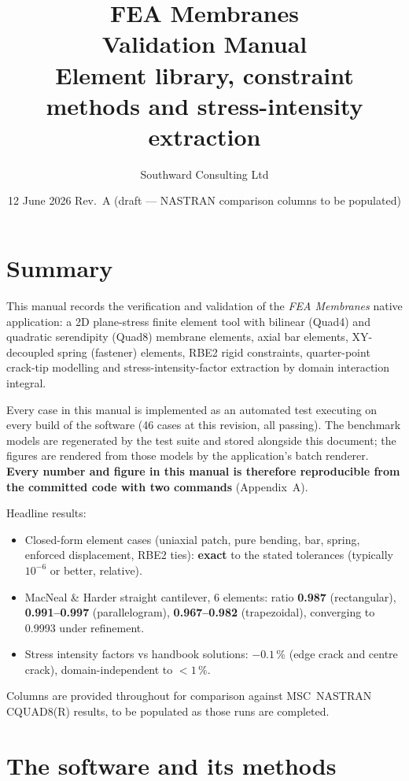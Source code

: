 \documentclass[11pt,a4paper]{report}
\title{\textbf{FEA Membranes}\\[2mm]\LARGE Validation Manual\\[4mm]
\large Element library, constraint methods and stress-intensity extraction}
\author{Southward Consulting Ltd}
\date{12 June 2026 \quad Rev.\ A (draft --- NASTRAN comparison columns to be populated)}
\begin{document}
\maketitle

\chapter*{Summary}

This manual records the verification and validation of the \emph{FEA Membranes}
native application: a 2D plane-stress finite element tool with bilinear (Quad4)
and quadratic serendipity (Quad8) membrane elements, axial bar elements,
XY-decoupled spring (fastener) elements, RBE2 rigid constraints, quarter-point
crack-tip modelling and stress-intensity-factor extraction by domain
interaction integral.

Every case in this manual is implemented as an automated test executing on
every build of the software (46 cases at this revision, all passing). The
benchmark models are regenerated by the test suite and stored alongside this
document; the figures are rendered from those models by the application's
batch renderer. \textbf{Every number and figure in this manual is therefore
reproducible from the committed code with two commands} (Appendix~A).

Headline results:
\begin{itemize}
  \item Closed-form element cases (uniaxial patch, pure bending, bar, spring,
        enforced displacement, RBE2 ties): \textbf{exact} to the stated
        tolerances (typically $10^{-6}$ or better, relative).
  \item MacNeal \& Harder straight cantilever, 6 elements: ratio
        \textbf{0.987} (rectangular), \textbf{0.991--0.997} (parallelogram),
        \textbf{0.967--0.982} (trapezoidal), converging to 0.9993 under
        refinement.
  \item Stress intensity factors vs handbook solutions: \textbf{$-0.1\,\%$}
        (edge crack and centre crack), domain-independent to $<1\,\%$.
\end{itemize}

Columns are provided throughout for comparison against MSC~NASTRAN CQUAD8(R)
results, to be populated as those runs are completed.

\tableofcontents

\chapter{The software and its methods}
\end{document}
